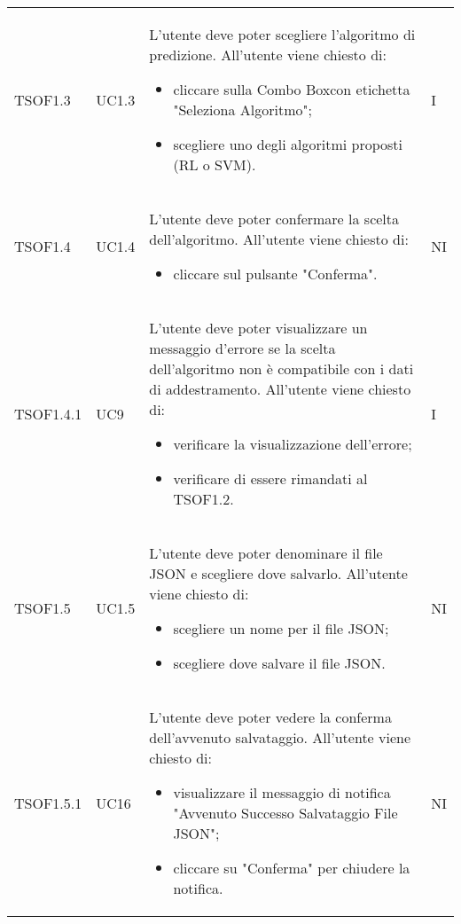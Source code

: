 \begin{longtable}{C{2.5cm} C{2.5cm} L{8cm} C{2cm}}
TSOF1.3 & UC1.3 & 
L'utente deve poter scegliere l'algoritmo di predizione. \newline All'utente viene chiesto di:
\begin{itemize}
	\item cliccare sulla Combo Box\glo con etichetta "Seleziona Algoritmo";
	\item scegliere uno degli algoritmi proposti (RL o SVM).
\end{itemize} & I \\
 
TSOF1.4 & UC1.4 & 
L'utente deve poter confermare la scelta dell'algoritmo. \newline All'utente viene chiesto di:
\begin{itemize}
	\item cliccare sul pulsante "Conferma".
\end{itemize} & NI \\

TSOF1.4.1 & UC9 & 
L'utente deve poter visualizzare un messaggio d'errore se la scelta dell'algoritmo non è compatibile con i dati di addestramento. \newline All'utente viene chiesto di:
\begin{itemize}
	\item verificare la visualizzazione dell'errore;
	\item verificare di essere rimandati al TSOF1.2.
\end{itemize} & I \\

TSOF1.5 & UC1.5 & 
L'utente deve poter denominare il file JSON e scegliere dove salvarlo. \newline All'utente viene chiesto di:
\begin{itemize}
	\item scegliere un nome per il file JSON;
	\item scegliere dove salvare il file JSON.
\end{itemize} & NI \\

TSOF1.5.1 & UC16 &
L'utente deve poter vedere la conferma dell'avvenuto salvataggio. \newline All'utente viene chiesto di:
\begin{itemize}
	\item visualizzare il messaggio di notifica "Avvenuto Successo Salvataggio File JSON";
	\item cliccare su "Conferma" per chiudere la notifica.
\end{itemize} & NI	\\


\end{longtable}

